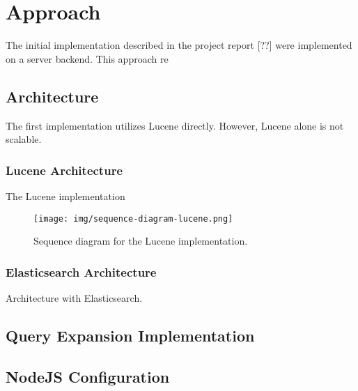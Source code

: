 \chapter{Approach}
\label{ch:approach}
The initial implementation described in the project report [??] were implemented on a server backend.
This approach re

\section{Architecture}
The first implementation utilizes Lucene directly.
However, Lucene alone is not scalable.

\subsection{Lucene Architecture}
The Lucene implementation

\begin{figure}[h!]
\centering \texttt{[image: img/sequence-diagram-lucene.png]}
\caption{Sequence diagram for the Lucene implementation.}
\label{fig:sequence-diagram-lucene}
\end{figure}

\subsection{Elasticsearch Architecture}
Architecture with Elasticsearch.

\section{Query Expansion Implementation}

\section{NodeJS Configuration}
